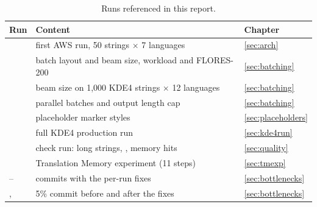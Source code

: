 \begin{table}[H]
\centering
\caption[Recorded runs]{Runs referenced in this report.}
\label{tab:runs}
\begin{tabularx}{\linewidth}{@{}l L l@{}}
\toprule
\textbf{Run} & \textbf{Content} & \textbf{Chapter} \\
\midrule
{} & first AWS run, 50 strings $\times$ 7 languages & \ref{sec:arch} \\
 & batch layout and beam size,  workload and FLORES-200 & \ref{sec:batching} \\
 & beam size on 1,000 KDE4 strings $\times$ 12 languages & \ref{sec:batching} \\
 & parallel batches and output length cap & \ref{sec:batching} \\
 & placeholder marker styles & \ref{sec:placeholders} \\
 & full KDE4 production run & \ref{sec:kde4run} \\
 & check run: long strings, , memory hits & \ref{sec:quality} \\
 & Translation Memory experiment (11 steps) & \ref{sec:tmexp} \\
 --  & commits with the per-run fixes & \ref{sec:bottlenecks} \\
,  & 5\% commit before and after the fixes & \ref{sec:bottlenecks} \\
\bottomrule
\end{tabularx}
\end{table}
